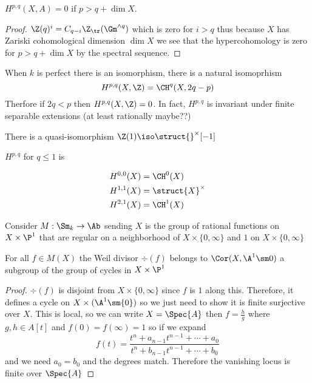 \documentclass[12pt]{article}
\begin{document}
\begin{theorem}
$H^{p,q}(X, A) = 0$ if $p > q + \dim{X}$. 
\end{theorem}

\begin{proof}
$\Z(q)^i = C_{q-i}\Z_{\tr}(\Gm^{\wedge q})$ which is zero for $i > q$ thus because $X$ has Zariski cohomological dimension $\dim{X}$ we see that the hypercohomology is zero for $p > q + \dim{X}$ by the spectral sequence. 
\end{proof}

\begin{theorem}
When $k$ is perfect there is an isomorphism, there is a natural isomoprhism
\[ H^{p,q}(X, \Z) = \CH^q(X, 2q - p) \]
Therfore if $2 q < p$ then $H^{p,q}(X, \Z) = 0$. In fact, $H^{p,q}$ is invariant under finite separable extensions (at least rationally maybe??)
\end{theorem}

\begin{theorem}
There is a quasi-isomorphism $\Z(1) \iso \struct{}^\times[-1]$
\end{theorem}

\begin{cor}
$H^{p,q}$ for $q \le 1$ is 

\begin{align*}
 H^{0,0}(X) &= \CH^0(X)
 \\
 H^{1,1}(X) &= \struct{X}^\times
 \\
 H^{2,1}(X) &= \CH^1(X)
\end{align*}
\end{cor}

Consider $M : \Sm_k \to \Ab$ sending $X$ is the group of rational functions on $X \times \P^1$ that are regular on a neighborhood of $X \times \{ 0, \infty \}$ and $1$ on $X \times \{ 0, \infty \}$ 

\begin{lemma}
For all $f \in M(X)$ the Weil divisor $\div(f)$ belongs to $\Cor(X, \A^1 \sm 0)$ a subgroup of the group of cycles in $X \times \P^1$
\end{lemma}

\begin{proof}
$\div(f)$ is disjoint from $X \times \{ 0, \infty \}$ since $f$ is $1$ along this. Therefore, it defines a cycle on $X \times (\A^1 \sm \{ 0 \})$ so we just need to show it is finite surjective over $X$. This is local, so we can write $X = \Spec{A}$ then $f = \frac{h}{g}$ where $g,h \in A[t]$ and $f(0) = f(\infty) = 1$ so if we expand
\[ f(t) = \frac{t^n + a_{n-1} t^{n-1} + \cdots + a_0}{t^n + b_{n-1} t^{n-1} + \cdots + b_0} \]
and we need $a_0 = b_0$ and the degrees match. Therefore the vanishing locus is finite over $\Spec{A}$ 
\end{proof}
\end{document}
